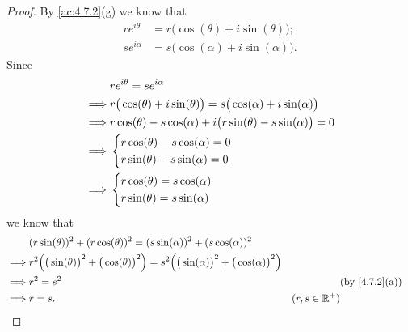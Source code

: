 \begin{proof}
  By \cref{ac:4.7.2}(g) we know that
  \begin{align*}
    r e^{i \theta} & = r \big(\cos(\theta) + i \sin(\theta)\big); \\
    s e^{i \alpha} & = s \big(\cos(\alpha) + i \sin(\alpha)\big).
  \end{align*}
  Since
  \begin{align*}
             & r e^{i \theta} = s e^{i \alpha}                                                       \\
    \implies & r \big(\cos(\theta) + i \sin(\theta)\big) = s \big(\cos(\alpha) + i \sin(\alpha)\big) \\
    \implies & r \cos(\theta) - s \cos(\alpha) + i \big(r \sin(\theta) - s \sin(\alpha)\big) = 0     \\
    \implies & \begin{dcases}
                 r \cos(\theta) - s \cos(\alpha) = 0 \\
                 r \sin(\theta) - s \sin(\alpha) = 0
               \end{dcases}                                                   \\
    \implies & \begin{dcases}
                 r \cos(\theta) = s \cos(\alpha) \\
                 r \sin(\theta) = s \sin(\alpha)
               \end{dcases}
  \end{align*}
  we know that
  \begin{align*}
             & (r \sin(\theta))^2 + (r \cos(\theta))^2 = (s \sin(\alpha))^2 + (s \cos(\alpha))^2                                                                                                     \\
    \implies & r^2 \Big(\big(\sin(\theta)\big)^2 + \big(\cos(\theta)\big)^2\Big) = s^2 \Big(\big(\sin(\alpha)\big)^2 + \big(\cos(\alpha)\big)^2\Big)                                                 \\
    \implies & r^2 = s^2                                                                                                                             &                 & \text{(by \cref{4.7.2}(a))} \\
    \implies & r = s.                                                                                                                                & (r, s \in \R^+)
  \end{align*}

\end{proof}
